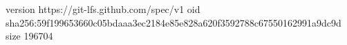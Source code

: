 version https://git-lfs.github.com/spec/v1
oid sha256:59f199653660c05bdaaa3ec2184e85e828a620f3592788c67550162991a9dc9d
size 196704
